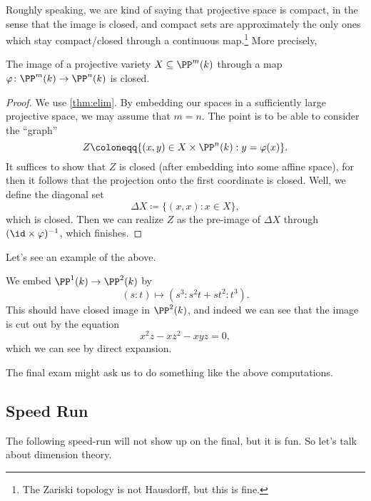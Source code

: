 Roughly speaking, we are kind of saying that projective space is compact, in the sense that the image is closed, and compact sets are approximately the only ones which stay compact/closed through a continuous map.\footnote{The Zariski topology is not Hausdorff, but this is fine.} More precisely, 
\begin{corollary}
	The image of a projective variety $X\subseteq\PP^m(k)$ through a map $\varphi\colon\PP^m(k)\to\PP^n(k)$ is closed.
\end{corollary}
\begin{proof}
	We use \autoref{thm:elim}. By embedding our spaces in a sufficiently large projective space, we may assume that $m=n$. The point is to be able to consider the ``graph''
	\[Z\coloneqq\{(x,y)\in X\times\PP^n(k):y=\varphi(x)\}.\]
	It suffices to show that $Z$ is closed (after embedding into some affine space), for then it follows that the projection onto the first coordinate is closed. Well, we define the diagonal set
	\[\Delta X\coloneqq\{(x,x):x\in X\},\]
	which is closed. Then we can realize $Z$ as the pre-image of $\Delta X$ through $(\id\times\varphi)^{-1}$, which finishes.
\end{proof}
Let's see an example of the above.
\begin{ex}
	We embed $\PP^1(k)\to\PP^2(k)$ by
	\[(s:t)\mapsto\left(s^3:s^2t+st^2:t^3\right).\]
	This should have closed image in $\PP^2(k)$, and indeed we can see that the image is cut out by the equation
	\[x^2z-xz^2-xyz=0,\]
	which we can see by direct expansion.
\end{ex}
\begin{remark}
	The final exam might ask us to do something like the above computations.
\end{remark}

\subsection{Speed Run}
The following speed-run will not show up on the final, but it is fun. So let's talk about dimension theory.

